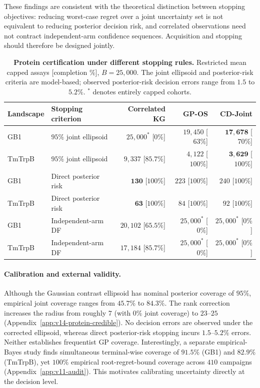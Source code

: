 \documentclass{article}
\theoremstyle{plain}
\theoremstyle{definition}
\begin{document}
These findings are consistent with the theoretical distinction
between stopping objectives: reducing worst-case regret over
a joint uncertainty set is not equivalent to reducing posterior
decision risk, and correlated observations need not contract
independent-arm confidence sequences. Acquisition and stopping
should therefore be designed jointly.

\begin{table}[t]
\centering\small
\caption{\textbf{Protein certification under different stopping rules.}
Restricted mean capped assays [completion \%], $B=25{,}000$.
The joint ellipsoid and posterior-risk criteria are model-based;
observed posterior-risk decision errors range from $1.5$ to $5.2\%$.
$^*$ denotes entirely capped cohorts.}
\label{tab:main-protein-summary}
\setlength{\tabcolsep}{4.5pt}
\begin{tabular}{@{}llrrr@{}}
\toprule
Landscape & Stopping criterion & Correlated KG & GP-OS & CD-Joint \\
\midrule
GB1 & $95\%$ joint ellipsoid & $25{,}000^*$ [$0\%$] & $19{,}450$ [$63\%$] & $\mathbf{17{,}678}$ [$70\%$] \\
TmTrpB & $95\%$ joint ellipsoid & $9{,}337$ [$85.7\%$] & $4{,}122$ [$100\%$] & $\mathbf{3{,}629}$ [$100\%$] \\
\midrule
GB1 & Direct posterior risk & $\mathbf{130}$ [$100\%$] & $223$ [$100\%$] & $240$ [$100\%$] \\
TmTrpB & Direct posterior risk & $\mathbf{63}$ [$100\%$] & $84$ [$100\%$] & $92$ [$100\%$] \\
\midrule
GB1 & Independent-arm DF & $20{,}102$ [$65.5\%$] & $25{,}000^*$ [$0\%$] & $25{,}000^*$ [$0\%$] \\
TmTrpB & Independent-arm DF & $17{,}184$ [$85.7\%$] & $25{,}000^*$ [$0\%$] & $25{,}000^*$ [$0\%$] \\
\bottomrule
\end{tabular}
\vspace{-3pt}
\end{table}

\paragraph{Calibration and external validity.}
Although the Gaussian contrast ellipsoid has nominal posterior
coverage of $95\%$, empirical joint coverage ranges from $45.7\%$
to $84.3\%$. The rank correction increases the radius from roughly
$7$ (with $0\%$ joint coverage) to $23$--$25$
(Appendix~\ref{app:v14-protein-credible}).
No decision errors are observed under the corrected ellipsoid,
whereas direct posterior-risk stopping incurs $1.5$--$5.2\%$
errors. Neither establishes frequentist GP coverage.
Interestingly, a separate empirical-Bayes study finds simultaneous
terminal-wise coverage of $91.5\%$ (GB1) and $82.9\%$ (TmTrpB),
yet $100\%$ empirical root-regret-bound coverage across $410$
campaigns (Appendix~\ref{app:v11-audit}). This motivates
calibrating uncertainty directly at the decision level.
\end{document}
